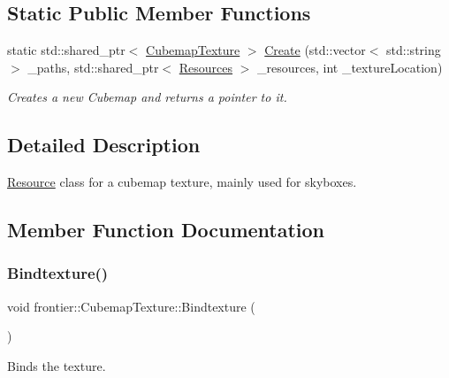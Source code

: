 \subsection*{Static Public Member Functions}
\begin{DoxyCompactItemize}
\item 
static std\+::shared\+\_\+ptr$<$ \hyperlink{classfrontier_1_1_cubemap_texture}{Cubemap\+Texture} $>$ \hyperlink{classfrontier_1_1_cubemap_texture_ae26508030889b6ee8b754b2be3eac943}{Create} (std\+::vector$<$ std\+::string $>$ \+\_\+paths, std\+::shared\+\_\+ptr$<$ \hyperlink{classfrontier_1_1_resources}{Resources} $>$ \+\_\+resources, int \+\_\+texture\+Location)
\begin{DoxyCompactList}\small\item\em Creates a new Cubemap and returns a pointer to it. \end{DoxyCompactList}\end{DoxyCompactItemize}


\subsection{Detailed Description}
\hyperlink{classfrontier_1_1_resource}{Resource} class for a cubemap texture, mainly used for skyboxes. 

\subsection{Member Function Documentation}
\mbox{\label{classfrontier_1_1_cubemap_texture_aeddd79b5a1e438b532baf79be95452c7}} 
\subsubsection{\texorpdfstring{Bindtexture()}{Bindtexture()}}
{\footnotesize\ttfamily void frontier\+::\+Cubemap\+Texture\+::\+Bindtexture (\begin{DoxyParamCaption}{ }\end{DoxyParamCaption})}



Binds the texture. 

\mbox{\label{classfrontier_1_1_cubemap_texture_ae26508030889b6ee8b754b2be3eac943}} 
